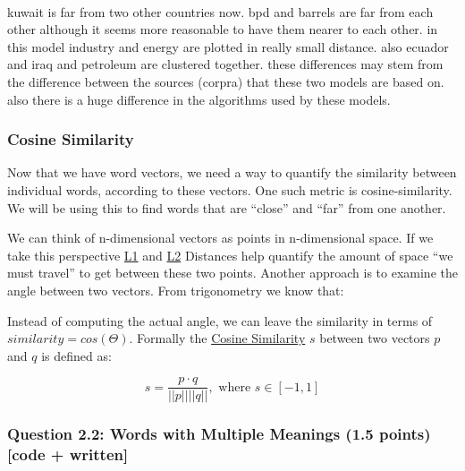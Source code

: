 \documentclass[11pt]{article}
\begin{document}
    \begin{center}
    \end{center}
    { \hspace*{\fill} \\}
    
    kuwait is far from two other countries now. bpd and barrels are far from
each other although it seems more reasonable to have them nearer to each
other. in this model industry and energy are plotted in really small
distance. also ecuador and iraq and petroleum are clustered together.
these differences may stem from the difference between the sources
(corpra) that these two models are based on. also there is a huge
difference in the algorithms used by these models.

    \hypertarget{cosine-similarity}{%
\subsubsection{Cosine Similarity}\label{cosine-similarity}}

Now that we have word vectors, we need a way to quantify the similarity
between individual words, according to these vectors. One such metric is
cosine-similarity. We will be using this to find words that are
``close'' and ``far'' from one another.

We can think of n-dimensional vectors as points in n-dimensional space.
If we take this perspective
\href{http://mathworld.wolfram.com/L1-Norm.html}{L1} and
\href{http://mathworld.wolfram.com/L2-Norm.html}{L2} Distances help
quantify the amount of space ``we must travel'' to get between these two
points. Another approach is to examine the angle between two vectors.
From trigonometry we know that:

Instead of computing the actual angle, we can leave the similarity in
terms of \(similarity = cos(\Theta)\). Formally the
\href{https://en.wikipedia.org/wiki/Cosine_similarity}{Cosine
Similarity} \(s\) between two vectors \(p\) and \(q\) is defined as:

\[s = \frac{p \cdot q}{||p|| ||q||}, \textrm{ where } s \in [-1, 1] \]

    \hypertarget{question-2.2-words-with-multiple-meanings-1.5-points-code-written}{%
\subsubsection{Question 2.2: Words with Multiple Meanings (1.5 points)
{[}code +
written{]}}\label{question-2.2-words-with-multiple-meanings-1.5-points-code-written}}
\end{document}
